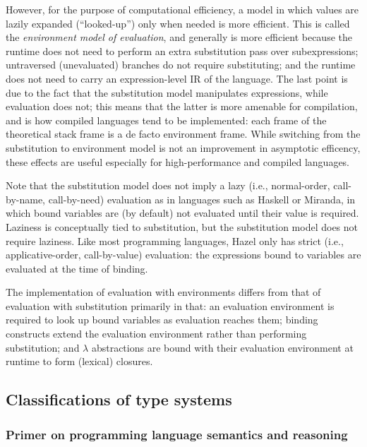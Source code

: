 However, for the purpose of computational efficiency, a model in which values are lazily expanded (``looked-up'') only when needed is more efficient. This is called the \textit{environment model of evaluation}, and generally is more efficient because the runtime does not need to perform an extra substitution pass over subexpressions; untraversed (unevaluated) branches do not require substituting; and the runtime does not need to carry an expression-level IR of the language. The last point is due to the fact that the substitution model manipulates expressions, while evaluation does not; this means that the latter is more amenable for compilation, and is how compiled languages tend to be implemented: each frame of the theoretical stack frame is a de facto environment frame. While switching from the substitution to environment model is not an improvement in asymptotic efficency, these effects are useful especially for high-performance and compiled languages.

Note that the substitution model does not imply a lazy (i.e., normal-order, call-by-name, call-by-need) evaluation as in languages such as Haskell or Miranda, in which bound variables are (by default) not evaluated until their value is required. Laziness is conceptually tied to substitution, but the substitution model does not require laziness. Like most programming languages, Hazel only has strict (i.e., applicative-order, call-by-value) evaluation: the expressions bound to variables are evaluated at the time of binding.


The implementation of evaluation with environments differs from that of evaluation with substitution primarily in that: an evaluation environment is required to look up bound variables as evaluation reaches them; binding constructs extend the evaluation environment rather than performing substitution; and $\lambda$ abstractions are bound with their evaluation environment at runtime to form (lexical) closures.

\subsection{Classifications of type systems}
\label{sec:ts_classifications}

\subsubsection{Primer on programming language semantics and reasoning}
\label{sec:pl_semantics}

